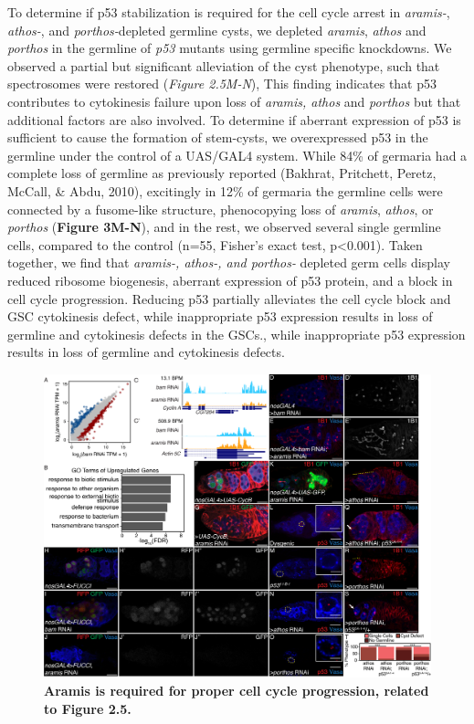 \documentclass[12pt,oneside]{reedthesis}
\begin{document}
To determine if p53 stabilization is required for the cell cycle arrest in \emph{aramis-}, \emph{athos-}, and \emph{porthos-}depleted germline cysts, we depleted \emph{aramis}, \emph{athos} and \emph{porthos} in the germline of \emph{p53} mutants using germline specific knockdowns. We observed a partial but significant alleviation of the cyst phenotype, such that spectrosomes were restored (\emph{Figure 2.5M-N}), This finding indicates that p53 contributes to cytokinesis failure upon loss of \emph{aramis, athos} and \emph{porthos} but that additional factors are also involved. To determine if aberrant expression of p53 is sufficient to cause the formation of stem-cysts, we overexpressed p53 in the germline under the control of a UAS/GAL4 system. While 84\% of germaria had a complete loss of germline as previously reported (Bakhrat, Pritchett, Peretz, McCall, \& Abdu, 2010), excitingly in 12\% of germaria the germline cells were connected by a fusome-like structure, phenocopying loss of \emph{aramis}, \emph{athos}, or \emph{porthos} (\textbf{Figure 3M-N}), and in the rest, we observed several single germline cells, compared to the control (n=55, Fisher's exact test, p\textless0.001). Taken together, we find that \emph{aramis-, athos-, and porthos-} depleted germ cells display reduced ribosome biogenesis, aberrant expression of p53 protein, and a block in cell cycle progression. Reducing p53 partially alleviates the cell cycle block and GSC cytokinesis defect, while inappropriate p53 expression results in loss of germline and cytokinesis defects in the GSCs., while inappropriate p53 expression results in loss of germline and cytokinesis defects.
\begin{figure}

{\centering \includegraphics[width=1\linewidth]{./figure/Ribosome Biogenesis/Ribosome Biogenesis 3S} 

}

\caption[\textbf{Aramis is required for proper cell cycle progression, related to Figure 2.5.}]{\textbf{Aramis is required for proper cell cycle progression, related to Figure 2.5.}}\label{fig:unnamed-chunk-13}
\end{figure}
\end{document}
